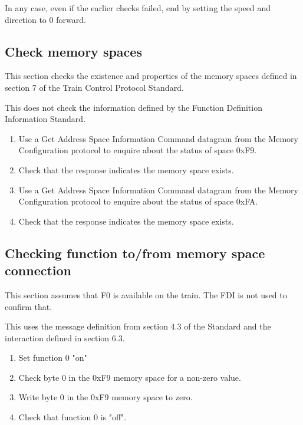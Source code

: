 In any case, even if the earlier checks failed, end by setting the speed 
and direction to 0 forward.

\subsection{Check memory spaces}

This section checks the existence and properties of the memory spaces defined in section 7
of the Train Control Protocol Standard.

This does not check the information defined by the 
Function Definition Information Standard.

\begin{enumerate}

\item Use a Get Address Space Information Command datagram from the Memory Configuration protocol
to enquire about the status of space 0xF9.

\item Check that the response indicates the memory space exists.

\item Use a Get Address Space Information Command datagram from the Memory Configuration protocol
to enquire about the status of space 0xFA.

\item Check that the response indicates the memory space exists.

\end{enumerate}
    
\subsection{Checking function to/from memory space connection}

This section assumes that F0 is available on the train.
The FDI is not used to confirm that.

This uses the message definition from section 4.3 of the Standard 
and the interaction defined in section 6.3.

\begin{enumerate}

    \item Set function 0 "on"

    \item Check byte 0 in the 0xF9 memory space for a non-zero value.

    \item Write byte 0 in the 0xF9 memory space to zero.

    \item Check that function 0 is "off".

\end{enumerate}


